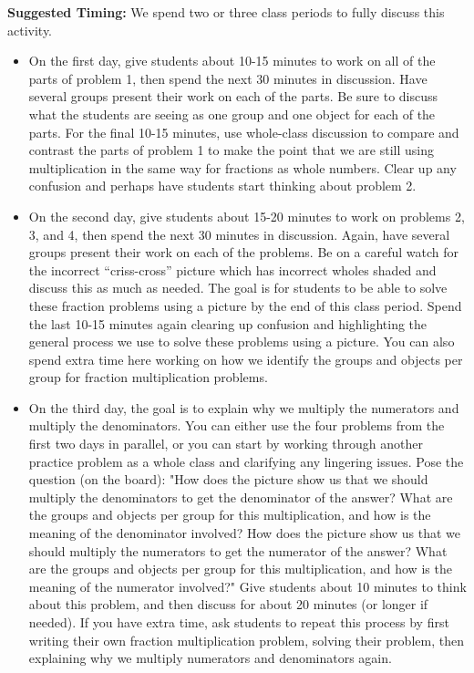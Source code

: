\documentclass{ximera}
\begin{document}
\begin{instructorNotes}
{\bf Suggested Timing:} We spend two or three class periods to fully discuss this activity.  
\begin{itemize}
	\item On the first day, give students about 10-15 minutes to work on all of the parts of problem 1, then spend the next 30 minutes in discussion. Have several groups present their work on each of the parts. Be sure to discuss what the students are seeing as one group and one object for each of the parts. For the final 10-15 minutes, use whole-class discussion to compare and contrast the parts of problem 1 to make the point that we are still using multiplication in the same way for fractions as whole numbers. Clear up any confusion and perhaps have students start thinking about problem 2.
	\item On the second day, give students about 15-20 minutes to work on problems 2, 3, and 4, then spend the next 30 minutes in discussion. Again, have several groups present their work on each of the problems. Be on a careful watch for the incorrect ``criss-cross'' picture which has incorrect wholes shaded and discuss this as much as needed. The goal is for students to be able to solve these fraction problems using a picture by the end of this class period. Spend the last 10-15 minutes again clearing up confusion and highlighting the general process we use to solve these problems using a picture. You can also spend extra time here working on how we identify the groups and objects per group for fraction multiplication problems.
	\item On the third day, the goal is to explain why we multiply the numerators and multiply the denominators. You can either use the four problems from the first two days in parallel, or you can start by working through another practice problem as a whole class and clarifying any lingering issues. Pose the question (on the board): "How does the picture show us that we should multiply the denominators to get the denominator of the answer? What are the groups and objects per group for this multiplication, and how is the meaning of the denominator involved? How does the picture show us that we should multiply the numerators to get the numerator of the answer? What are the groups and objects per group for this multiplication, and how is the meaning of the numerator involved?" Give students about 10 minutes to think about this problem, and then discuss for about 20 minutes (or longer if needed). If you have extra time, ask students to repeat this process by first writing their own fraction multiplication problem, solving their problem, then explaining why we multiply numerators and denominators again.
\end{itemize}

\end{instructorNotes}
\end{document}
